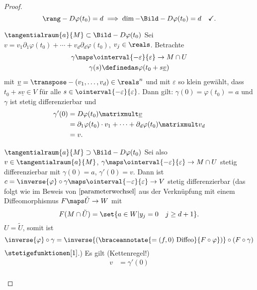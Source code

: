 \begin{proof}
  \begin{equation*}
    \rang-{D\varphi(t_0)=d\implies \dim-{\Bild-{D\varphi(t_0)}}}=d\quad \checkmark.
  \end{equation*}
  \begin{proofdescription}
    \item[\( \tangentialraum{a}{M}\subset \Bild-{D\varphi(t_0)} \)]
    Sei \( v=v_1\partial_1 \varphi(t_0)+\dotsb+v_d\partial_d \varphi(t_0) \), \( v_j\in \reals \). Betrachte 
    \begin{gather*}
      \gamma\maps \ointerval{-\varepsilon}{\varepsilon}\to M\cap U\\
      \gamma(s)\definedas \varphi(t_0+s\underline{v})
    \end{gather*}
    mit \( \underline{v}=\transpose-{(v_1,\dotsc,v_d)}\in \reals^n \) und mit \( \varepsilon \) so klein gewählt, dass \( t_0+s\underline{v}\in V \) für alle \( s\in \ointerval{-\varepsilon}{\varepsilon} \). Dann gilt: \( \gamma(0)=\varphi(t_0)=a \) und \( \gamma \) ist stetig differenzierbar und
    \begin{align*}
      \gamma'(0)&=D\varphi(t_0)\matrixmult \underline{v}\\
      &=\partial_1 \varphi(t_0)\cdot v_1+\dotsb+\partial_d\varphi(t_0)\matrixmult v_d\\
      &=v.
    \end{align*}
    \item[\( \tangentialraum{a}{M}\supset \Bild-{D\varphi(t_0)} \)] Sei also \( v\in \tangentialraum{a}{M} \), \( \gamma\maps \ointerval{-\varepsilon}{\varepsilon}\to M\cap U \) stetig differenzierbar mit \( \gamma(0)=a \), \( \gamma'(0)=v \). Dann ist \( c=\inverse{\varphi}\circ \gamma\maps \ointerval{-\varepsilon}{\varepsilon}\to V  \) stetig differenzierbar (das folgt wie im Beweis von \( \ref{parameterwechsel} \) aus der Verknüpfung mit einem Diffeomorphismus \( F\maps \tilde{U}\to W \) mit
    \begin{equation*}
      F(M\cap \tilde{U})=\set{a\in W|y_j=0\quad j\geq d+1}.
    \end{equation*} 
    \Obda \( U=\tilde{U} \), somit ist
    \begin{equation*}
      \inverse{\varphi}\circ \gamma=\inverse{(\braceannotate{=(f,0)\text{\ Diffeo}}{F\circ \varphi})}\circ (F\circ \gamma)
    \end{equation*}
    \( \stetigefunktionen[1] \).) Es gilt (Kettenregel!)
    \begin{align*}
      v&=\gamma'(0)\\

\end{align*}
\end{proofdescription}
\end{proof}
